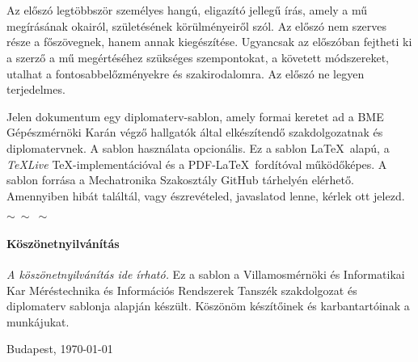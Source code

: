 \chapter*{\eloszo}

Az előszó legtöbbször személyes hangú, eligazító jellegű írás, amely a mű megírásának okairól, születésének körülményeiről szól. Az előszó nem szerves része a főszövegnek, hanem annak kiegészítése.
Ugyancsak az előszóban fejtheti ki a szerző a mű megértéséhez szükséges szempontokat, a követett módszereket, utalhat a fontosabbelőzményekre és szakirodalomra.
Az előszó ne legyen terjedelmes.


\vspace{0.5cm}
Jelen dokumentum egy diplomaterv-sablon, amely formai keretet ad a BME Gépészmérnöki Karán végző hallgatók által elkészítendő szakdolgozatnak és diplomatervnek. A sablon használata opcionális. Ez a sablon \LaTeX~alapú, a \emph{TeXLive} \TeX-implementációval és a PDF-\LaTeX~fordítóval működőképes.
A sablon forrása a Mechatronika Szakosztály GitHub tárhelyén\footnotemark{} elérhető. Amennyiben hibát találtál, vagy észrevételed, javaslatod lenne, kérlek ott jelezd.


\begin{center}
    $\sim \: \sim \: \sim$
\end{center}


\subsubsection*{Köszönetnyilvánítás}
\emph{A köszönetnyilvánítás ide írható.} Ez a sablon a Villamosmérnöki és Informatikai Kar Méréstechnika és Információs Rendszerek Tanszék szakdolgozat és diplomaterv sablonja alapján készült. Köszönöm készítőinek és karbantartóinak a munkájukat.


\vspace{0.5cm}

\begin{flushleft}
{Budapest, \today}
\end{flushleft}

\begin{flushright}
\emph{\szerzo}
\end{flushright}

\vfill
